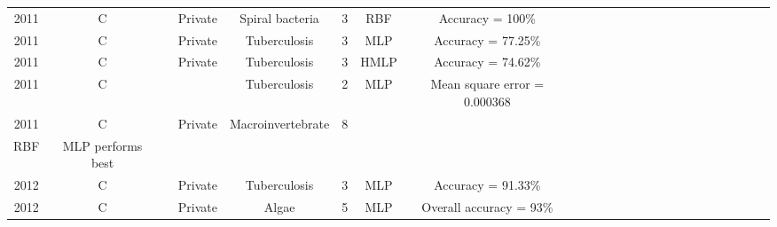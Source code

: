 \begin{landscape}
\begin{longtable}{cccccccccccccccccccccccc}
2011 & C    & \cite{Hiremath-2011-DMIA}     & Private          & Spiral bacteria                                & 3                & RBF                                                            & Accuracy = 100\%                                                                                                                                                                  \\
2011 & C    & \cite{Osman-2011-TBDZ}        & Private          & Tuberculosis                                   & 3                & MLP                                                     & Accuracy = 77.25\%                                                                                                                                                                \\
2011 & C    & \cite{Osman-2011-HMPN}        & Private          & Tuberculosis                                   & 3                & HMLP                                                           & Accuracy = 74.62\%                                                                                                                                                                \\
2011 & C    & \cite{Rulaningtyas-2011-ACTB} & \cite{Forero-2004-ITBB} & Tuberculosis                 & 2                & MLP                                                            & Mean square error = 0.000368                                                                                                                                                      \\
2011 & C    & \cite{Kiranyaz-2011-CRMI}     & Private          & Macroinvertebrate                              & 8                & \begin{tabular}[c]{@{}c@{}}MLP\\ RBF\end{tabular} & MLP performs best                                                                                                                                                                 \\
2012 & C    & \cite{Osman-2012-OSEL}        & Private          & Tuberculosis                                   & 3                & MLP                                                     & Accuracy =  91.33\%                                                                                                                                                               \\
2012 & C    & \cite{Mosleh-2012-APSA}       & Private          & Algae                                          & 5                & MLP                                                            & Overall accuracy = 93\%                                                                                                                                                           \\

\end{longtable}
\end{landscape}
